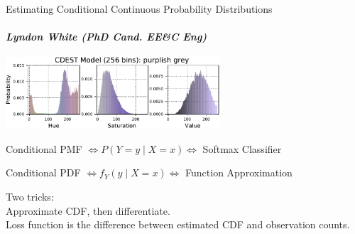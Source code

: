\documentclass[dvipsnames]{beamer}
\begin{document}
\begin{frame}{Estimating Conditional Continuous Probability Distributions}
	\framesubtitle{\emph{\normalsize Lyndon White (PhD Cand. EE\&C Eng)}}
	\centering
	\includegraphics[width=0.6\textwidth]{gru256purplishgrey}

	\raggedright

	Conditional PMF $\iff P(Y=y \mid X=x) \iff$ Softmax Classifier\\
	\vfill
	
	Conditional PDF $\iff f_Y(y \mid X=x)\iff $ Function Approximation\\
	\vfill 
	
	\alert{Two tricks:} \\
	Approximate CDF, then differentiate.\\
	Loss function is the difference between estimated CDF and observation counts.\\
	\vfill
\end{frame}
\end{document}
